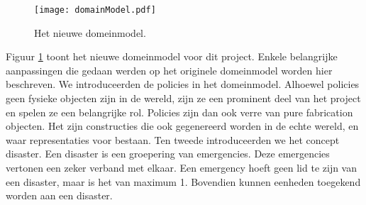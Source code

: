 \label{domeinmodel}
\begin{figure}[htb]
\centering
\texttt{[image: domainModel.pdf]}
\caption{Het nieuwe domeinmodel.}
\label{fig:newDomainModel}
\end{figure}
Figuur \ref{fig:newDomainModel} toont het nieuwe domeinmodel voor dit project. Enkele belangrijke aanpassingen die gedaan werden op het originele domeinmodel worden hier beschreven. We introduceerden de policies in het domeinmodel. Alhoewel policies geen fysieke objecten zijn in de wereld, zijn ze een prominent deel van het project en spelen ze een belangrijke rol. Policies zijn dan ook verre van pure fabrication objecten. Het zijn constructies die ook gegenereerd worden in de echte wereld, en waar representaties voor bestaan. Ten tweede introduceerden we het concept disaster. Een disaster is een groepering van emergencies. Deze emergencies vertonen een zeker verband met elkaar. Een emergency hoeft geen lid te zijn van een disaster, maar is het van maximum 1. Bovendien kunnen eenheden toegekend worden aan een disaster.